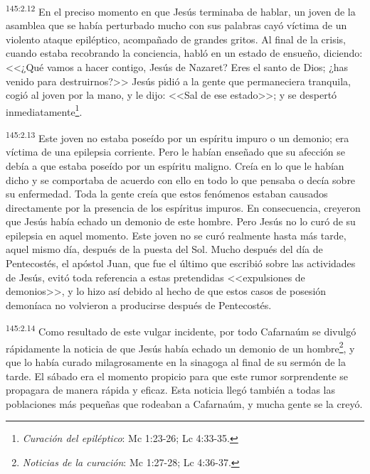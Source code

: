 \par 
\textsuperscript{145:2.12} En el preciso momento en que Jesús terminaba de hablar, un joven de la asamblea que se había perturbado mucho con sus palabras cayó víctima de un violento ataque epiléptico, acompañado de grandes gritos. Al final de la crisis, cuando estaba recobrando la conciencia, habló en un estado de ensueño, diciendo: <<¿Qué vamos a hacer contigo, Jesús de Nazaret? Eres el santo de Dios; ¿has venido para destruirnos?>> Jesús pidió a la gente que permaneciera tranquila, cogió al joven por la mano, y le dijo: <<Sal de ese estado>>; y se despertó inmediatamente\footnote{\textit{Curación del epiléptico}: Mc 1:23-26; Lc 4:33-35.}.

\par 
\textsuperscript{145:2.13} Este joven no estaba poseído por un espíritu impuro o un demonio; era víctima de una epilepsia corriente. Pero le habían enseñado que su afección se debía a que estaba poseído por un espíritu maligno. Creía en lo que le habían dicho y se comportaba de acuerdo con ello en todo lo que pensaba o decía sobre su enfermedad. Toda la gente creía que estos fenómenos estaban causados directamente por la presencia de los espíritus impuros. En consecuencia, creyeron que Jesús había echado un demonio de este hombre. Pero Jesús no lo curó de su epilepsia en aquel momento. Este joven no se curó realmente hasta más tarde, aquel mismo día, después de la puesta del Sol. Mucho después del día de Pentecostés, el apóstol Juan, que fue el último que escribió sobre las actividades de Jesús, evitó toda referencia a estas pretendidas <<expulsiones de demonios>>, y lo hizo así debido al hecho de que estos casos de posesión demoníaca no volvieron a producirse después de Pentecostés.

\par 
\textsuperscript{145:2.14} Como resultado de este vulgar incidente, por todo Cafarnaúm se divulgó rápidamente la noticia de que Jesús había echado un demonio de un hombre\footnote{\textit{Noticias de la curación}: Mc 1:27-28; Lc 4:36-37.}, y que lo había curado milagrosamente en la sinagoga al final de su sermón de la tarde. El sábado era el momento propicio para que este rumor sorprendente se propagara de manera rápida y eficaz. Esta noticia llegó también a todas las poblaciones más pequeñas que rodeaban a Cafarnaúm, y mucha gente se la creyó.

